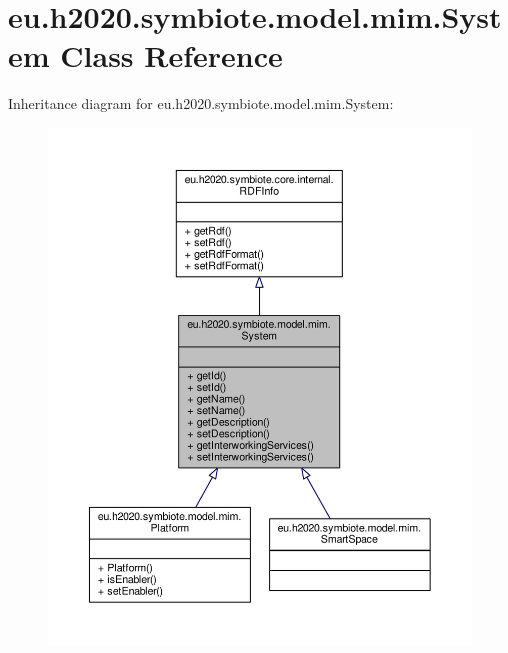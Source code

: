 \hypertarget{classeu_1_1h2020_1_1symbiote_1_1model_1_1mim_1_1System}{}\section{eu.\+h2020.\+symbiote.\+model.\+mim.\+System Class Reference}
\label{classeu_1_1h2020_1_1symbiote_1_1model_1_1mim_1_1System}


Inheritance diagram for eu.\+h2020.\+symbiote.\+model.\+mim.\+System\+:
\nopagebreak
\begin{figure}[H]
\begin{center}
\leavevmode
\includegraphics[width=350pt]{classeu_1_1h2020_1_1symbiote_1_1model_1_1mim_1_1System__inherit__graph}
\end{center}
\end{figure}


